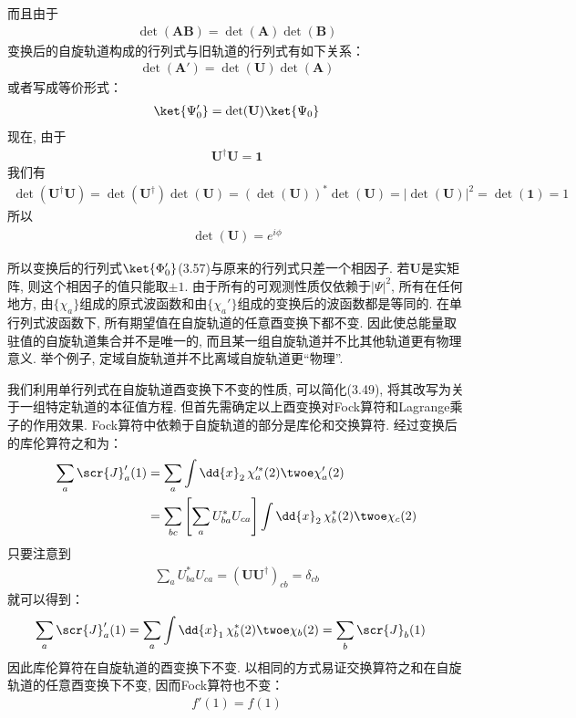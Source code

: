 而且由于
\begin{align}
\det(\mathbf{AB}) = \det(\mathbf{A})\det(\mathbf{B})
\end{align}
变换后的自旋轨道构成的行列式与旧轨道的行列式有如下关系：
\begin{align}
\det(\mathbf{A}') = \det(\mathbf{U})\det(\mathbf{A})
\end{align}
或者写成等价形式：
\begin{align}
\ket{\Psi_0'} = \det(\mathbf{U})\ket{\Psi_0}
\end{align}
现在, 由于
\begin{align}
\mathbf{U}^\dagger\mathbf{U} = \mathbf{1}
\end{align}
我们有
\begin{align}
\det(\mathbf{U}^\dagger\mathbf{U}) = \det(\mathbf{U}^\dagger)\det(\mathbf{U}) = (\det(\mathbf{U}))^*\det(\mathbf{U}) = |\det(\mathbf{U})|^2 = \det(\mathbf{1}) = 1
\end{align}
所以
\begin{align}
\det(\mathbf{U}) = e^{i\phi}
\end{align}

所以变换后的行列式$\ket{\Phi_0'}$(3.57)与原来的行列式只差一个相因子. 若$\mathbf{U}$是实矩阵, 则这个相因子的值只能取$\pm 1$. 由于所有的可观测性质仅依赖于$|\Psi|^2$, 所有在任何地方, 由$\{\chi_a\}$组成的原式波函数和由$\{\chi_a'\}$组成的变换后的波函数都是等同的. 在单行列式波函数下, 所有期望值在自旋轨道的任意酉变换下都不变. 因此使总能量取驻值的自旋轨道集合并不是唯一的, 而且某一组自旋轨道并不比其他轨道更有物理意义. 举个例子, 定域自旋轨道并不比离域自旋轨道更“物理”.

我们利用单行列式在自旋轨道酉变换下不变的性质, 可以简化(3.49), 将其改写为关于一组特定轨道的本征值方程. 但首先需确定以上酉变换对Fock算符和Lagrange乘子的作用效果. Fock算符中依赖于自旋轨道的部分是库伦和交换算符. 经过变换后的库伦算符之和为：
\begin{align}
\sum_a \scr{J}_a'(1) & = \sum_a\int\dd{x}_2\,\chi_a^{\prime*}(2)\twoe\chi_a'(2)\notag\\
                     & = \sum_{bc}\left[ \sum_a U_{ba}^* U_{ca}\right]\int\dd{x}_2\,\chi_b^*(2)\twoe\chi_c(2)
\end{align}
只要注意到
\begin{align}
\sum_a U_{ba}^* U_{ca} = (\mathbf{UU}^\dagger)_{cb} = \delta_{cb}
\end{align}
就可以得到：
\begin{align}
\sum_a \scr{J}_a'(1) & = \sum_a\int\dd{x}_1\,\chi_b^{*}(2)\twoe\chi_b(2) = \sum_{b}\scr{J}_b(1)
\end{align}
因此库伦算符在自旋轨道的酉变换下不变. 以相同的方式易证交换算符之和在自旋轨道的任意酉变换下不变, 因而Fock算符也不变：
\begin{align}
f'(1) = f(1)
\end{align}

